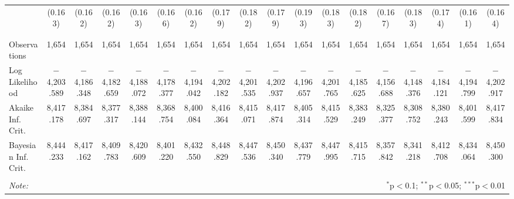 \begin{table}[!htbp]
\begin{tabular}{@{\extracolsep{5pt}}lccccccccccccccccc}
  & (0.163) & (0.162) & (0.162) & (0.163) & (0.166) & (0.162) & (0.179) & (0.182) & (0.179) & (0.193) & (0.183) & (0.182) & (0.167) & (0.183) & (0.174) & (0.161) & (0.164) \\ 
  & & & & & & & & & & & & & & & & & \\ 
\hline \\[-1.8ex] 
Observations & 1,654 & 1,654 & 1,654 & 1,654 & 1,654 & 1,654 & 1,654 & 1,654 & 1,654 & 1,654 & 1,654 & 1,654 & 1,654 & 1,654 & 1,654 & 1,654 & 1,654 \\ 
Log Likelihood & $-$4,203.589 & $-$4,186.348 & $-$4,182.659 & $-$4,188.072 & $-$4,178.377 & $-$4,194.042 & $-$4,202.182 & $-$4,201.535 & $-$4,202.937 & $-$4,196.657 & $-$4,201.765 & $-$4,185.625 & $-$4,156.688 & $-$4,148.376 & $-$4,184.121 & $-$4,194.799 & $-$4,202.917 \\ 
Akaike Inf. Crit. & 8,417.178 & 8,384.697 & 8,377.317 & 8,388.144 & 8,368.754 & 8,400.084 & 8,416.364 & 8,415.071 & 8,417.874 & 8,405.314 & 8,415.529 & 8,383.249 & 8,325.377 & 8,308.752 & 8,380.243 & 8,401.599 & 8,417.834 \\ 
Bayesian Inf. Crit. & 8,444.233 & 8,417.162 & 8,409.783 & 8,420.609 & 8,401.220 & 8,432.550 & 8,448.829 & 8,447.536 & 8,450.340 & 8,437.779 & 8,447.995 & 8,415.715 & 8,357.842 & 8,341.218 & 8,412.708 & 8,434.064 & 8,450.300 \\ 
\hline 
\hline \\[-1.8ex] 
\textit{Note:}  & \multicolumn{17}{r}{$^{*}$p$<$0.1; $^{**}$p$<$0.05; $^{***}$p$<$0.01} \\ 
\end{tabular} 
\end{table} 
